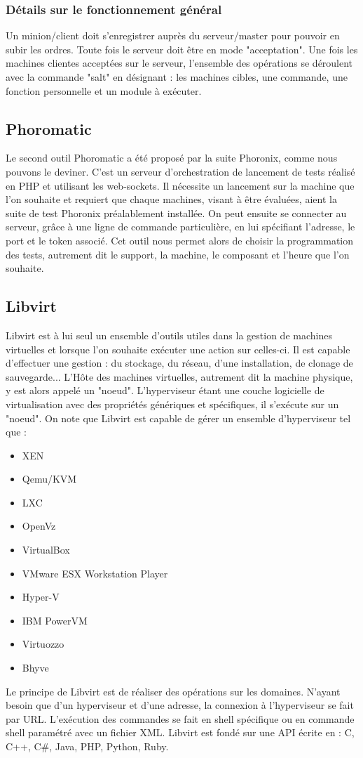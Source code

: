 \subsubsection{Détails sur le fonctionnement général}

Un minion/client doit s'enregistrer auprès du serveur/master pour pouvoir en subir les ordres. Toute fois le serveur doit être en mode "acceptation". Une fois les machines clientes acceptées sur le serveur, l'ensemble des opérations se déroulent avec la commande "salt" en désignant : les machines cibles, une commande, une fonction personnelle et un module à exécuter. 
 
\subsection{Phoromatic}
Le second outil Phoromatic a été proposé par la suite Phoronix, comme nous pouvons le deviner. C'est un serveur d'orchestration de lancement de tests réalisé en PHP et utilisant les web-sockets. Il nécessite un lancement sur la machine que l'on souhaite et requiert que chaque machines, visant à être évaluées, aient la suite de test Phoronix préalablement installée. On peut ensuite se connecter au serveur, grâce à une ligne de commande particulière, en lui spécifiant l'adresse, le port et le token associé. Cet outil nous permet alors de choisir la programmation des tests, autrement dit le support, la machine, le composant et l'heure que l'on souhaite. 

\subsection{Libvirt}

Libvirt est à lui seul un ensemble d'outils utiles dans la gestion de machines virtuelles et lorsque l'on souhaite exécuter une action sur celles-ci. Il est capable d'effectuer une gestion : du stockage, du réseau, d'une installation, de clonage de sauvegarde... 
L'Hôte des machines virtuelles, autrement dit la machine physique, y est alors appelé un "noeud". L'hyperviseur étant une couche logicielle de virtualisation avec des propriétés génériques et spécifiques, il s'exécute sur un "noeud". On note que Libvirt est capable de gérer un ensemble d'hyperviseur tel que : 
\begin{itemize}
\item XEN
\item Qemu/KVM
\item LXC
\item OpenVz
\item VirtualBox
\item VMware ESX Workstation Player
\item Hyper-V
\item IBM PowerVM
\item Virtuozzo
\item Bhyve
\end{itemize}
Le principe de Libvirt est de réaliser des opérations sur les domaines. N'ayant besoin que d'un hyperviseur et d'une adresse, la connexion à l'hyperviseur se fait par URL. L'exécution des commandes se fait en shell spécifique ou en commande shell paramétré avec un fichier XML. Libvirt est fondé sur une API écrite en : C, C++, C\#, Java, PHP, Python, Ruby.
\newpage
